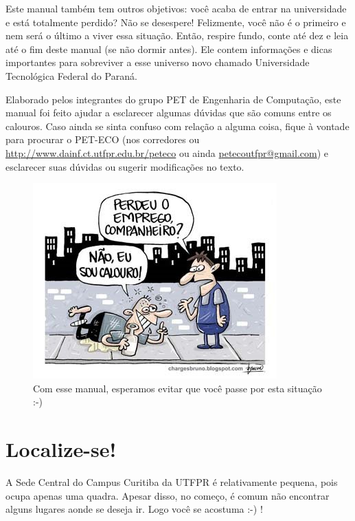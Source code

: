 \documentclass[a4paper,12pt,openany]{article}
\begin{document}
Este manual também tem outros objetivos: você acaba de entrar na universidade e está totalmente perdido? Não se desespere! Felizmente, você não é o primeiro e nem será o último a viver essa situação. Então, respire fundo, conte até dez e leia até o fim deste manual (se não dormir antes). Ele contem informações e dicas importantes para sobreviver a esse universo novo chamado Universidade Tecnológica Federal do Paraná.  

Elaborado pelos integrantes do grupo PET de Engenharia de Computação, este manual foi feito ajudar a esclarecer algumas dúvidas que são comuns entre os calouros. Caso ainda se sinta confuso com relação a alguma coisa, fique à vontade para procurar o PET-ECO (nos corredores ou \url{http://www.dainf.ct.utfpr.edu.br/peteco} ou ainda \href{mailto:petecoutfpr@gmail.com}{petecoutfpr@gmail.com}) e esclarecer suas dúvidas ou sugerir modificações no texto.


	\begin{figure}[ht!]  \centering
		\includegraphics[scale=1]{calouro.jpg}
		\caption{Com esse manual, esperamos evitar que você passe por esta situação :-) }
		\label{fig01}
	\end{figure}

	

\newpage
\section{Localize-se!}

A Sede Central do Campus Curitiba da UTFPR é relativamente pequena, pois ocupa apenas uma quadra. Apesar disso, no começo, é comum não encontrar alguns lugares aonde se deseja ir. Logo você se acostuma :-) !
\end{document}
